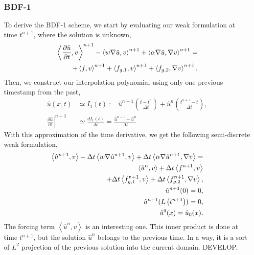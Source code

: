 \documentclass[../../main.tex]{subfiles}
\newcommand{\inner}[2]{\left<#1, #2\right>}
\begin{document}
\subsubsection{BDF-1}
To derive the BDF-1 scheme, we start by evaluating our weak formulation at time $t^{n+1}$, where the solution is unknown,
\begin{equation}
    \begin{split}
        \inner{\frac{\partial \hat{u}}{\partial t}}{v}^{n+1} 
        - \inner{w \grad \hat{u}}{v}^{n+1} 
        + \inner{\alpha \grad \hat{u}}{\grad v}^{n+1} =  \\
        + \inner{f}{v}^{n+1} + \inner{f_{g,1}}{v}^{n+1} + \inner{f_{g,2}}{\grad v}^{n+1}.
    \end{split}
\end{equation}
Then, we construct our interpolation polynomial using only one previous timestamp from the past, 
\begin{align}
    \hat{u}(x,t) &\simeq I_1(t) := 
    \hat{u}^{n+1}\left( \frac{t-t^{n}}{\Delta t}  \right)
    + \hat{u}^{n}\left(\frac{t^{n+1}-t}{\Delta t}\right), \\
    \left.\frac{\partial\hat{u}}{\partial t}\right|^{n+1} &\simeq \frac{d I_1(t)}{dt} = \frac{\hat{u}^{n+1} - \hat{u}^{n}}{\Delta t}
\end{align}
With this approximation of the time derivative, we get the following semi-discrete weak formulation, 
\begin{subequations}
    \begin{align}
        \label{eq:1d_fom_weak_formulation_semidiscrete_time}
        \inner{\hat{u}^{n+1}}{v} 
        - \Delta t \inner{w \grad \hat{u}^{n+1}}{v} 
        + \Delta t \inner{\alpha \grad \hat{u}^{n+1}}{\grad v} = \nonumber \\ 
        \inner{\hat{u}^{n}}{v} 
        + \Delta t \inner{f^{n+1}}{v} \nonumber \\
        + \Delta t \inner{f_{g,1}^{n+1}}{v} + \Delta t \inner{f_{g,2}^{n+1}}{\grad v}, \\
        \hat{u}^{n+1}(0) = 0, \\
        \hat{u}^{n+1}(L\left(t^{n+1}\right)) = 0, \\
        \hat{u}^{0}(x) = \hat{u}_0(x).
    \end{align}
\end{subequations}
The forcing term $\inner{\hat{u}^{n}}{v}$ is an interesting one.
This inner product is done at time $t^{n+1}$, but the solution $\hat{u}^{n}$ belongs to the previous time. 
In a way, it is a sort of $L^2$ projection of the previous solution into the current domain.
DEVELOP. 
\end{document}
